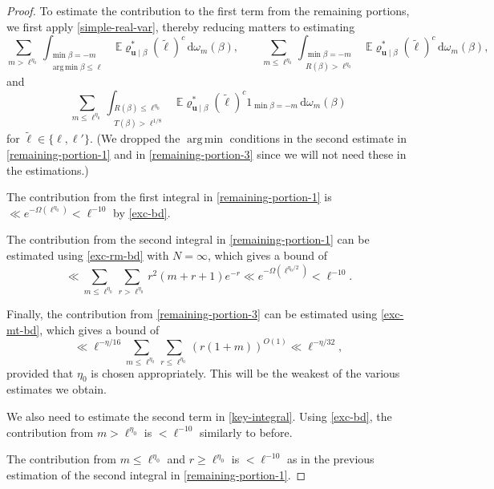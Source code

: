 \documentclass[10pt,a4paper]{amsart}
\DeclareMathOperator*{\argmin}{arg\,min}
\renewcommand{\ge}{\geqslant}
\renewcommand{\le}{\leqslant}
\newcommand{\mb}{\mathbb}
\newcommand{\mbf}{\mathbf}
\begin{document}
\begin{proof}
To estimate the contribution to the first term from the remaining portions, we first apply \cref{simple-real-var}, thereby reducing matters to estimating
\begin{equation}\label{remaining-portion-1} \sum_{m >\ell^{\eta_0}}\int_{\substack{\min \beta = -m \\\argmin \beta  \le \ell }}
\mb{E} \varrho^*_{\mbf{u} \mid \beta}(\tilde\ell)^c  \, \mathrm{d}\omega_m(\beta),\qquad \sum_{m \le \ell^{\eta_0}}\int_{\substack{\min \beta = -m \\
R(\beta) > \ell^{\eta_0}}}
\mb{E} \varrho^*_{\mbf{u} \mid \beta}(\tilde\ell)^c  \, \mathrm{d}\omega_m(\beta),\end{equation} 
and
\begin{equation}\label{remaining-portion-3} \sum_{m \le \ell^{\eta_0}}\int_{\substack{R(\beta) \le \ell^{\eta_0} \\ T(\beta) > \ell^{1/8}}}
\mb{E} \varrho^*_{\mbf{u} \mid \beta}(\tilde\ell)^c 1_{\min \beta = -m} \, \mathrm{d}\omega_m(\beta)\end{equation} for $\tilde\ell \in \{ \ell, \ell'\}$. (We dropped the $\argmin$ conditions in the second estimate in \cref{remaining-portion-1} and in \cref{remaining-portion-3} since we will not need these in the estimations.)

The contribution from the first integral in \cref{remaining-portion-1} is $\ll e^{-\Omega(\ell^{\eta_0})} < \ell^{-10}$ by \cref{exc-bd}.

The contribution from the second integral in \cref{remaining-portion-1} can be estimated using \cref{exc-rm-bd} with $N = \infty$, which gives a bound of 
\begin{equation}\label{mr-bd} \ll \sum_{m \le \ell^{\eta_0}} \sum_{r > \ell^{\eta_0}} r^2 (m + r + 1) e^{-r} \ll e^{-\Omega(\ell^{\eta_0/2})} < \ell^{-10}. \end{equation}

Finally, the contribution from \cref{remaining-portion-3} can be estimated using \cref{exc-mt-bd}, which gives a bound of
\[ \ll \ell^{-\eta/16} \sum_{m \le \ell^{\eta_0}} \sum_{r \le \ell^{\eta_0}} (r(1 + m))^{O(1)} \ll \ell^{-\eta/32},\]
provided that $\eta_0$ is chosen appropriately. This will be the weakest of the various estimates we obtain.

We also need to estimate the second term in \cref{key-integral}. Using \cref{exc-bd}, the contribution from $m > \ell^{\eta_0}$ is $< \ell^{-10}$ similarly to before.

The contribution from $m \le \ell^{\eta_0}$ and $r \ge \ell^{\eta_0}$ is $< \ell^{-10}$ as in the previous estimation of the second integral in \cref{remaining-portion-1}.


\end{proof}
\end{document}
